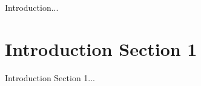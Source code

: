\label{sec:1}

Introduction...

\section{Introduction Section 1}
\label{sec:1.1}

Introduction Section 1... 
